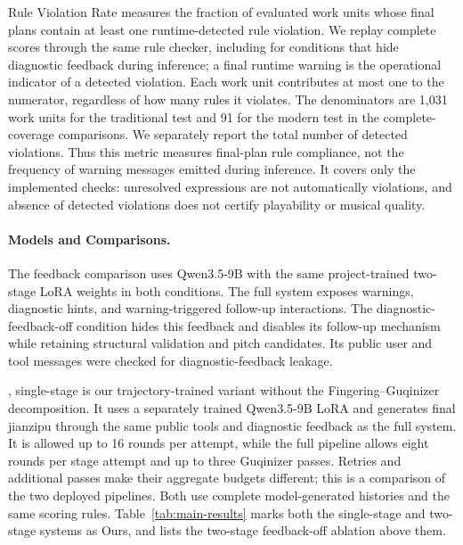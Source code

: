 Rule Violation Rate measures the fraction of evaluated work units whose final plans contain at least one runtime-detected rule violation. We replay complete scores through the same rule checker, including for conditions that hide diagnostic feedback during inference; a final runtime warning is the operational indicator of a detected violation. Each work unit contributes at most one to the numerator, regardless of how many rules it violates. The denominators are 1,031 work units for the traditional test and 91 for the modern test in the complete-coverage comparisons. We separately report the total number of detected violations. Thus this metric measures final-plan rule compliance, not the frequency of warning messages emitted during inference. It covers only the implemented checks: unresolved expressions are not automatically violations, and absence of detected violations does not certify playability or musical quality.

\paragraph{Models and Comparisons.}
The feedback comparison uses Qwen3.5-9B with the same project-trained two-stage LoRA weights in both conditions. The full system exposes warnings, diagnostic hints, and warning-triggered follow-up interactions. The diagnostic-feedback-off condition hides this feedback and disables its follow-up mechanism while retaining structural validation and pitch candidates. Its public user and tool messages were checked for diagnostic-feedback leakage.

\system{}, single-stage is our trajectory-trained variant without the Fingering--Guqinizer decomposition. It uses a separately trained Qwen3.5-9B LoRA and generates final jianzipu through the same public tools and diagnostic feedback as the full system. It is allowed up to 16 rounds per attempt, while the full pipeline allows eight rounds per stage attempt and up to three Guqinizer passes. Retries and additional passes make their aggregate budgets different; this is a comparison of the two deployed pipelines. Both use complete model-generated histories and the same scoring rules. Table~\ref{tab:main-results} marks both the single-stage and two-stage systems as Ours, and lists the two-stage feedback-off ablation above them.

